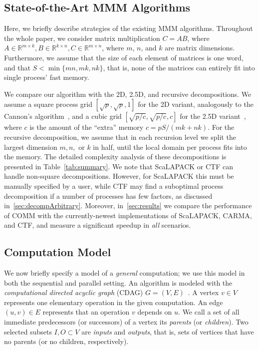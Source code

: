 \documentclass[sigplan,review,anonymous,10pt]{acmart}\settopmatter{printfolios=true,printccs=false,printacmref=false}
\begin{document}
\subsection{State-of-the-Art MMM Algorithms}
\label{sec:state-of-the-artAlgs}

Here, we briefly describe strategies of the existing MMM algorithms.
Throughout the whole paper, we consider matrix multiplication $C = 
AB$, where $A \in \mathbb{R}^{m \times k}, B \in \mathbb{R}^{k \times n},  C 
\in \mathbb{R}^{m \times 
	n}$, where $m$, $n$, and $k$ are matrix dimensions. Furthermore, we assume 
that the size of each element of matrices is one word, and that $S < 
\min\{mn, mk, nk\}$, that is, none of the matrices can entirely 
fit into single process' fast memory. 

We compare our algorithm with the 2D, 2.5D, and recursive 
decompositions. We assume a square process grid $[\sqrt{p}, \sqrt{p}, 1]$ 
for the 2D variant, analogously 
to the Cannon's algorithm~\cite{Cannon}, and a cubic grid $[\sqrt{p/c}, 
\sqrt{p/c}, c]$ for the 2.5D 
variant~\cite{25d}, where $c$ is the amount of the ``extra'' memory $c = 
pS/(mk 
+ nk)$. For the recursive decomposition, we assume that in each recursion level 
we split the largest dimension $m,n,$ or $k$ in half, until the local domain 
per 
process fits into the memory.
	The detailed complexity analysis of these decompositions is 
presented in 
Table~\ref{tab:summary}.
We note that ScaLAPACK or CTF can handle non-square 
decompositions. However, for ScaLAPACK this must be manually specified by a 
user, while CTF may find a suboptimal process decomposition if a number of 
processes has few factors, as discussed in~\cref{sec:decompArbitrary}. 
Moreover, 
in~\cref{sec:results} we compare the 
performance of COMM with the currently-newest implementations of ScaLAPACK, 
CARMA,  
and CTF, and measure a significant speedup in \emph{all} scenarios. 

\subsection{Computation Model}
\label{sec:compModel}

We now briefly specify a model of a \emph{general} computation; we use this
model in both the sequential and parallel setting.
An algorithm is modeled with the \emph{computational directed acyclic graph} 
(CDAG)
$G=(V,E)$~\cite{completeRegisterProblems,pebblegameregister,
registerpebblecolor}. A vertex $v \in V$ represents one
elementary operation in the given computation. An edge $(u,v) \in E$
represents that an operation $v$ depends on $u$. We call a set of all
immediate predecessors (or successors) of a vertex its \emph{parents} (or
\emph{children}).  Two selected subsets $I, O \subset V$ are \emph{inputs} and
\emph{outputs}, that is, sets of vertices that have no parents (or no children,
respectively).
\end{document}
